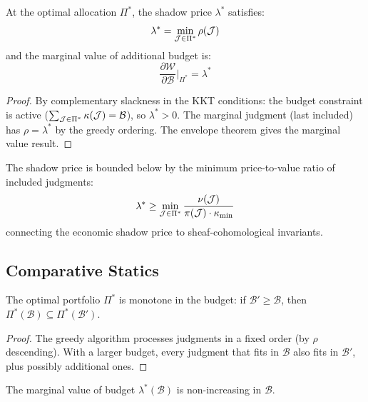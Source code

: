 \documentclass[11pt]{article}
\newcommand{\VerifBudget}{\mathcal{B}}
\newcommand{\TrustPrice}{\pi}
\newcommand{\TrustValue}{\nu}
\newcommand{\VerifCost}{\kappa}
\newcommand{\TrustReturn}{\rho}
\newcommand{\Welfare}{\mathcal{W}}
\newcommand{\Shadow}{\lambda}
\begin{document}
\begin{theorem}\label{thm:budget-duality}
At the optimal allocation $\Pi^*$, the shadow price $\Shadow^*$
satisfies:
\[
  \Shadow^* = \min_{\J \in \Pi^*} \TrustReturn(\J)
\]
and the marginal value of additional budget is:
\[
  \frac{\partial \Welfare}{\partial \VerifBudget}\bigg|_{\Pi^*} = \Shadow^*
\]
\end{theorem}

\begin{proof}
By complementary slackness in the KKT conditions: the budget
constraint is active ($\sum_{\J \in \Pi^*} \VerifCost(\J) = \VerifBudget$),
so $\Shadow^* > 0$.  The marginal judgment (last included) has
$\TrustReturn = \Shadow^*$ by the greedy ordering.  The envelope
theorem gives the marginal value result.
\end{proof}

\begin{corollary}\label{cor:cohom-shadow}
The shadow price is bounded below by the minimum price-to-value
ratio of included judgments:
\[
  \Shadow^* \geq \min_{\J \in \Pi^*} \frac{\TrustValue(\J)}
  {\TrustPrice(\J) \cdot \kappa_{\min}}
\]
connecting the economic shadow price to sheaf-cohomological invariants.
\end{corollary}

\subsection{Comparative Statics}

\begin{theorem}\label{thm:comparative}
The optimal portfolio $\Pi^*$ is monotone in the budget: if
$\VerifBudget' \geq \VerifBudget$, then
$\Pi^*(\VerifBudget) \subseteq \Pi^*(\VerifBudget')$.
\end{theorem}

\begin{proof}
The greedy algorithm processes judgments in a fixed order (by
$\TrustReturn$ descending).  With a larger budget, every judgment
that fits in $\VerifBudget$ also fits in $\VerifBudget'$, plus
possibly additional ones.
\end{proof}

\begin{proposition}\label{prop:diminishing}
The marginal value of budget $\Shadow^*(\VerifBudget)$ is
non-increasing in $\VerifBudget$.
\end{proposition}
\end{document}
